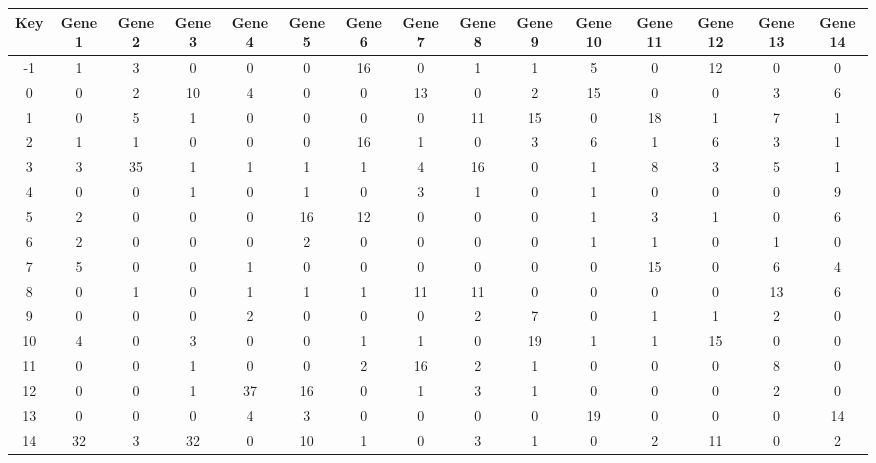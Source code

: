 \begin{tabular}{|c|c|c|c|c|c|c|c|c|c|c|c|c|c|c|}
\hline
Key & Gene 1 & Gene 2 & Gene 3 & Gene 4 & Gene 5 & Gene 6 & Gene 7 & Gene 8 & Gene 9 & Gene 10 & Gene 11 & Gene 12 & Gene 13 & Gene 14 \\
\hline
-1 & 1 & 3 & 0 & 0 & 0 & 16 & 0 & 1 & 1 & 5 & 0 & 12 & 0 & 0 \\
0 & 0 & 2 & 10 & 4 & 0 & 0 & 13 & 0 & 2 & 15 & 0 & 0 & 3 & 6 \\
1 & 0 & 5 & 1 & 0 & 0 & 0 & 0 & 11 & 15 & 0 & 18 & 1 & 7 & 1 \\
2 & 1 & 1 & 0 & 0 & 0 & 16 & 1 & 0 & 3 & 6 & 1 & 6 & 3 & 1 \\
3 & 3 & 35 & 1 & 1 & 1 & 1 & 4 & 16 & 0 & 1 & 8 & 3 & 5 & 1 \\
4 & 0 & 0 & 1 & 0 & 1 & 0 & 3 & 1 & 0 & 1 & 0 & 0 & 0 & 9 \\
5 & 2 & 0 & 0 & 0 & 16 & 12 & 0 & 0 & 0 & 1 & 3 & 1 & 0 & 6 \\
6 & 2 & 0 & 0 & 0 & 2 & 0 & 0 & 0 & 0 & 1 & 1 & 0 & 1 & 0 \\
7 & 5 & 0 & 0 & 1 & 0 & 0 & 0 & 0 & 0 & 0 & 15 & 0 & 6 & 4 \\
8 & 0 & 1 & 0 & 1 & 1 & 1 & 11 & 11 & 0 & 0 & 0 & 0 & 13 & 6 \\
9 & 0 & 0 & 0 & 2 & 0 & 0 & 0 & 2 & 7 & 0 & 1 & 1 & 2 & 0 \\
10 & 4 & 0 & 3 & 0 & 0 & 1 & 1 & 0 & 19 & 1 & 1 & 15 & 0 & 0 \\
11 & 0 & 0 & 1 & 0 & 0 & 2 & 16 & 2 & 1 & 0 & 0 & 0 & 8 & 0 \\
12 & 0 & 0 & 1 & 37 & 16 & 0 & 1 & 3 & 1 & 0 & 0 & 0 & 2 & 0 \\
13 & 0 & 0 & 0 & 4 & 3 & 0 & 0 & 0 & 0 & 19 & 0 & 0 & 0 & 14 \\
14 & 32 & 3 & 32 & 0 & 10 & 1 & 0 & 3 & 1 & 0 & 2 & 11 & 0 & 2 \\
\hline
\end{tabular}